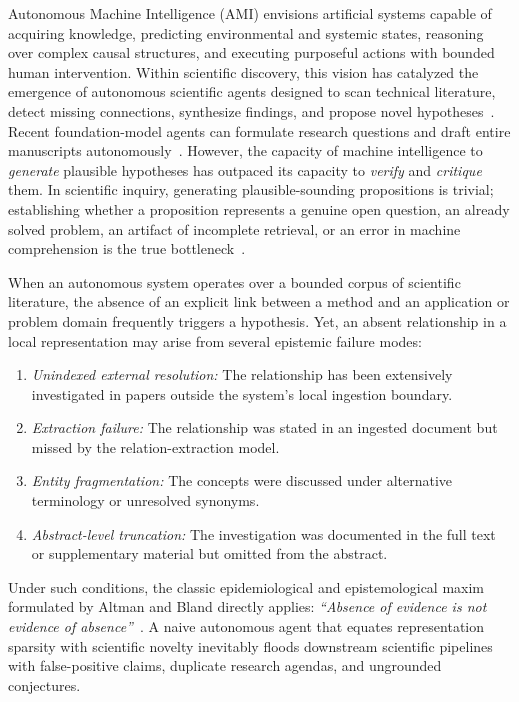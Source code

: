 \documentclass[conference,10pt]{IEEEtran}
\begin{document}
Autonomous Machine Intelligence (AMI) envisions artificial systems capable of acquiring knowledge, predicting environmental and systemic states, reasoning over complex causal structures, and executing purposeful actions with bounded human intervention. Within scientific discovery, this vision has catalyzed the emergence of autonomous scientific agents designed to scan technical literature, detect missing connections, synthesize findings, and propose novel hypotheses~\cite{langley1987,king2009automation,lecun2022path}. Recent foundation-model agents can formulate research questions and draft entire manuscripts autonomously~\cite{aiscientist}. However, the capacity of machine intelligence to \emph{generate} plausible hypotheses has outpaced its capacity to \emph{verify} and \emph{critique} them. In scientific inquiry, generating plausible-sounding propositions is trivial; establishing whether a proposition represents a genuine open question, an already solved problem, an artifact of incomplete retrieval, or an error in machine comprehension is the true bottleneck~\cite{wadden,schneider}.

When an autonomous system operates over a bounded corpus of scientific literature, the absence of an explicit link between a method and an application or problem domain frequently triggers a hypothesis. Yet, an absent relationship in a local representation may arise from several epistemic failure modes:
\begin{enumerate}[label=\arabic*),leftmargin=1.8em]
  \item \emph{Unindexed external resolution:} The relationship has been extensively investigated in papers outside the system's local ingestion boundary.
  \item \emph{Extraction failure:} The relationship was stated in an ingested document but missed by the relation-extraction model.
  \item \emph{Entity fragmentation:} The concepts were discussed under alternative terminology or unresolved synonyms.
  \item \emph{Abstract-level truncation:} The investigation was documented in the full text or supplementary material but omitted from the abstract.
\end{enumerate}

Under such conditions, the classic epidemiological and epistemological maxim formulated by Altman and Bland directly applies: \emph{``Absence of evidence is not evidence of absence''}~\cite{altman}. A naive autonomous agent that equates representation sparsity with scientific novelty inevitably floods downstream scientific pipelines with false-positive claims, duplicate research agendas, and ungrounded conjectures.
\end{document}
